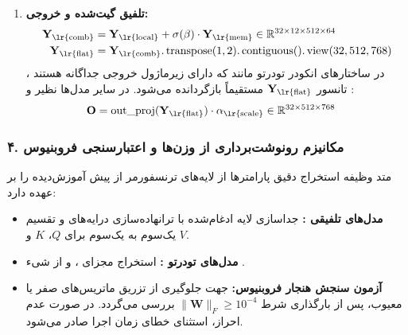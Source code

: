\begin{enumerate}
\begin{align*}
    \end{align*}
    ماسک پنجره لغزان به وسیله مقایسه ماتریسی نمایه‌ها محاسبه شده و درایه‌های خارج از فاصله ۱۲۸ توکن با مقدار $-10^4$ ماسک‌گذاری می‌شوند:
    \begin{align*}
    \mathbf{S}_{\text{\lr{local}}} &\leftarrow \mathbf{S}_{\text{\lr{local}}}.\operatorname{masked\_fill}(\sim \text{\lr{window\_mask}}, -1e4) \\
    \mathbf{A}_{\text{\lr{local}}} &= \operatorname{Dropout}(\operatorname{Softmax}(\mathbf{S}_{\text{\lr{local}}}, \text{\lr{dim}}=-1)) \in \mathbb{R}^{32 \times 12 \times 512 \times 512} \\
    \mathbf{Y}_{\text{\lr{local}}} &= \mathbf{A}_{\text{\lr{local}}} \mathbf{V} \in \mathbb{R}^{32 \times 12 \times 512 \times 64}
    \end{align*}
    \item \textbf{تلفیق گیت‌شده و خروجی:}
    \begin{align*}
    \mathbf{Y}_{\text{\lr{comb}}} &= \mathbf{Y}_{\text{\lr{local}}} + \sigma(\beta) \cdot \mathbf{Y}_{\text{\lr{mem}}} \in \mathbb{R}^{32 \times 12 \times 512 \times 64} \\
    \mathbf{Y}_{\text{\lr{flat}}} &= \mathbf{Y}_{\text{\lr{comb}}}.\operatorname{transpose}(1, 2).\operatorname{contiguous}().\operatorname{view}(32, 512, 768)
    \end{align*}
    در ساختارهای انکودر تودرتو مانند  که دارای زیرماژول خروجی جداگانه  هستند ، تانسور $\mathbf{Y}_{\text{\lr{flat}}}$ مستقیماً بازگردانده می‌شود. در سایر مدل‌ها نظیر  و :
    \begin{align*}
    \mathbf{O} &= \operatorname{out\_proj}(\mathbf{Y}_{\text{\lr{flat}}}) \cdot \alpha_{\text{\lr{scale}}} \in \mathbb{R}^{32 \times 512 \times 768}
    \end{align*}
\end{enumerate}

\subsubsection*{۴. مکانیزم رونوشت‌برداری از وزن‌ها  و اعتبارسنجی فروبنیوس}
متد  وظیفه استخراج دقیق پارامترها از لایه‌های ترنسفورمر از پیش آموزش‌دیده را بر عهده دارد:
\begin{itemize}
    \item \textbf{مدل‌های تلفیقی :} جداسازی لایه ادغام‌شده  با ترانهاده‌سازی درایه‌های  و تقسیم یک‌سوم به یک‌سوم برای $Q$، $K$ و $V$.
    \item \textbf{مدل‌های تودرتو :} استخراج مجزای ،  و  از شیء .
    \item \textbf{آزمون سنجش هنجار فروبنیوس:} جهت جلوگیری از تزریق ماتریس‌های صفر یا معیوب، پس از بارگذاری شرط $\|\mathbf{W}\|_F \ge 10^{-4}$ بررسی می‌گردد. در صورت عدم احراز، استثنای خطای زمان اجرا  صادر می‌شود.
\end{itemize}

